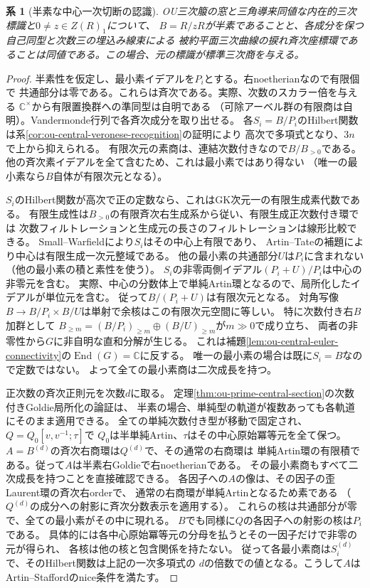 \documentclass[11pt,a4paper]{ltjsarticle}
\newtheorem{corollary}[theorem]{系}
\theoremstyle{definition}
\begin{document}
\begin{corollary}[半素な中心一次切断の認識]
\label{cor:ou-semiprime-central-section}
OU三次箙の窓と三角導来同値な内在的三次標識と$0\ne z\in Z(R)_1$について、
$B=R/zR$が半素であることと、各成分を保つ自己同型と次数三の埋込み線束による
被約平面三次曲線の捩れ斉次座標環であることは同値である。この場合、元の標識が標準三次商を与える。
\end{corollary}
\begin{proof}
半素性を仮定し、最小素イデアルを$P_i$とする。右noetherianなので有限個で
共通部分は零である。これらは斉次である。実際、次数のスカラー倍を与える
$\mathbb C^\times$から有限置換群への準同型は自明である
（可除アーベル群の有限商は自明）。Vandermonde行列で各斉次成分を取り出せる。
各$S_i=B/P_i$のHilbert関数は系\ref{cor:ou-central-veronese-recognition}の証明により
高次で多項式となり、$3n$で上から抑えられる。
有限次元の素商は、連結次数付きなので$B/B_{>0}$である。
他の斉次素イデアルを全て含むため、これは最小素ではあり得ない
（唯一の最小素なら$B$自体が有限次元となる）。

$S_i$のHilbert関数が高次で正の定数なら、これはGK次元一の有限生成素代数である。
有限生成性は$B_{>0}$の有限斉次右生成系から従い、有限生成正次数付き環では
次数フィルトレーションと生成元の長さのフィルトレーションは線形比較できる。
Small--Warfield\cite{SmallWarfield1984}により$S_i$はその中心上有限であり、
Artin--Tateの補題により中心は有限生成一次元整域である。
他の最小素の共通部分$U$は$P_i$に含まれない（他の最小素の積と素性を使う）。
$S_i$の非零両側イデアル$(P_i+U)/P_i$は中心の非零元を含む。
実際、中心の分数体上で単純Artin環となるので、局所化したイデアルが単位元を含む。
従って$B/(P_i+U)$は有限次元となる。
対角写像$B\to B/P_i\times B/U$は単射で余核はこの有限次元空間に等しい。
特に次数付き右$B$加群として
$B_{\ge m}=(B/P_i)_{\ge m}\oplus (B/U)_{\ge m}$が$m\gg0$で成り立ち、
両者の非零性から$G$に非自明な直和分解が生じる。
これは補題\ref{lem:ou-central-euler-connectivity}の$\operatorname{End}(G)=\mathbb C$に反する。
唯一の最小素の場合は既に$S_i=B$なので定数ではない。
よって全ての最小素商は二次成長を持つ。

正次数の斉次正則元を次数$d$に取る\cite[\S6]{StaffordVdB2001}。
定理\ref{thm:ou-prime-central-section}の次数付きGoldie局所化の論証は、
半素の場合、単純型の軌道が複数あっても各軌道にそのまま適用できる。
全ての単純次数付き型が移動で固定され、$Q=Q_0[v,v^{-1};\tau]$で
$Q_0$は半単純Artin、$\tau$はその中心原始冪等元を全て保つ。
$A=B^{(d)}$の斉次右商環は$Q^{(d)}$で、その通常の右商環は
単純Artin環の有限積である。従って$A$は半素右Goldieで右noetherianである。
その最小素商もすべて二次成長を持つことを直接確認できる。
各因子への$A$の像は、その因子の歪Laurent環の斉次右orderで、
通常の右商環が単純Artinとなるため素である
（$Q^{(d)}$の成分への射影に斉次分数表示を適用する）。
これらの核は共通部分が零で、全ての最小素がその中に現れる。
$B$でも同様に$Q$の各因子への射影の核は$P_i$である。
具体的には各中心原始冪等元の分母を払うとその一因子だけで非零の元が得られ、
各核は他の核と包含関係を持たない。
従って各最小素商は$S_i^{(d)}$で、そのHilbert関数は上記の一次多項式の
$d$の倍数での値となる。こうして$A$はArtin--Staffordのnice条件を満たす。


\end{proof}
\end{document}
